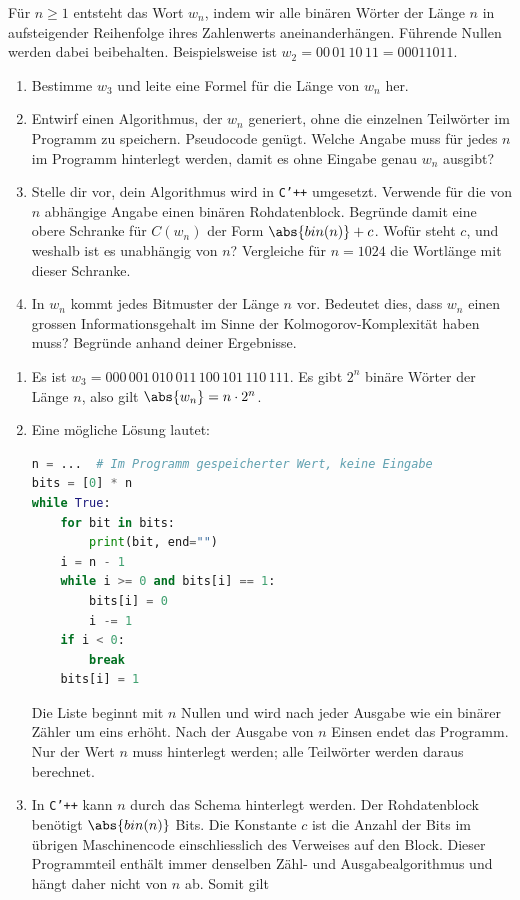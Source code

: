 \begin{myexercise}\label{myexercise:definition_kolmogorov}
	Für $n\geq 1$ entsteht das Wort $w_n$, indem wir alle binären Wörter der Länge $n$ in aufsteigender Reihenfolge ihres Zahlenwerts aneinanderhängen. Führende Nullen werden dabei beibehalten. Beispielsweise ist $w_2=00\,01\,10\,11=00011011$.
	\begin{enumerate}
		\item Bestimme $w_3$ und leite eine Formel für die Länge von $w_n$ her.
		\item Entwirf einen Algorithmus, der $w_n$ generiert, ohne die einzelnen Teilwörter im Programm zu speichern. Pseudocode genügt. Welche Angabe muss für jedes $n$ im Programm hinterlegt werden, damit es ohne Eingabe genau $w_n$ ausgibt?
		\item Stelle dir vor, dein Algorithmus wird in \texttt{C'++} umgesetzt. Verwende für die von $n$ abhängige Angabe einen binären Rohdatenblock. Begründe damit eine obere Schranke für $C(w_n)$ der Form $\abs{bin(n)}+c$. Wofür steht $c$, und weshalb ist es unabhängig von $n$? Vergleiche für $n=1024$ die Wortlänge mit dieser Schranke.
		\item In $w_n$ kommt jedes Bitmuster der Länge $n$ vor. Bedeutet dies, dass $w_n$ einen grossen Informationsgehalt im Sinne der Kolmogorov-Komplexität haben muss? Begründe anhand deiner Ergebnisse.
	\end{enumerate}
	\begin{myanswer}
		\begin{enumerate}
			\item Es ist $w_3=000\,001\,010\,011\,100\,101\,110\,111$. Es gibt $2^n$ binäre Wörter der Länge $n$, also gilt $\abs{w_n}=n\cdot 2^n$.
			\item Eine mögliche Lösung lautet:
\begin{lstlisting}[language=Python]
n = ...  # Im Programm gespeicherter Wert, keine Eingabe
bits = [0] * n
while True:
    for bit in bits:
        print(bit, end="")
    i = n - 1
    while i >= 0 and bits[i] == 1:
        bits[i] = 0
        i -= 1
    if i < 0:
        break
    bits[i] = 1
\end{lstlisting}
			Die Liste beginnt mit $n$ Nullen und wird nach jeder Ausgabe wie ein binärer Zähler um eins erhöht. Nach der Ausgabe von $n$ Einsen endet das Programm. Nur der Wert $n$ muss hinterlegt werden; alle Teilwörter werden daraus berechnet.
			\item In \texttt{C'++} kann $n$ durch das Schema  hinterlegt werden. Der Rohdatenblock benötigt $\abs{bin(n)}$ Bits. Die Konstante $c$ ist die Anzahl der Bits im übrigen Maschinencode einschliesslich des Verweises auf den Block. Dieser Programmteil enthält immer denselben Zähl- und Ausgabealgorithmus und hängt daher nicht von $n$ ab. Somit gilt

\end{enumerate}
\end{myanswer}
\end{myexercise}
